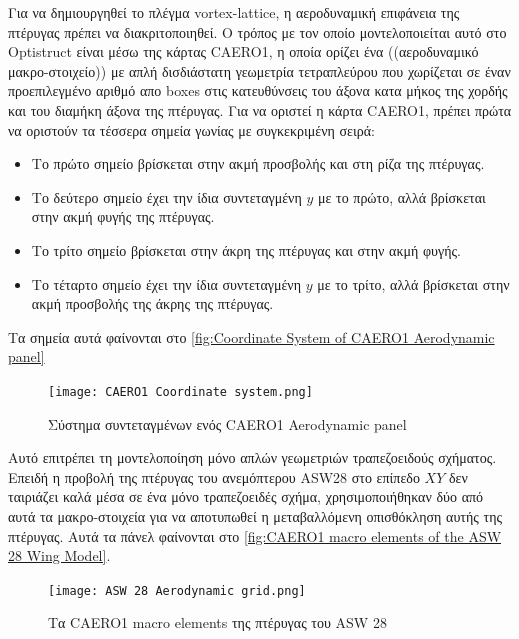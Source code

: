 Για να δημιουργηθεί το πλέγμα \textlatin{vortex-lattice}, η αεροδυναμική επιφάνεια της πτέρυγας πρέπει να διακριτοποιηθεί. Ο τρόπος με τον οποίο μοντελοποιείται αυτό στο \textlatin{Optistruct} είναι μέσω της κάρτας \textlatin{CAERO1}, η οποία ορίζει ένα ((αεροδυναμικό μακρο-στοιχείο)) με απλή δισδιάστατη γεωμετρία τετραπλεύρου που χωρίζεται σε έναν προεπιλεγμένο αριθμό απο \textlatin{boxes} στις κατευθύνσεις του άξονα κατα μήκος της χορδής και του διαμήκη άξονα της πτέρυγας. Για να οριστεί η κάρτα \textlatin{CAERO1}, πρέπει πρώτα να οριστούν τα τέσσερα σημεία γωνίας με συγκεκριμένη σειρά:


\begin{itemize}
  \item
    Το πρώτο σημείο βρίσκεται στην ακμή προσβολής και στη ρίζα της πτέρυγας.
  \item
    Το δεύτερο σημείο έχει την ίδια συντεταγμένη \(y\) με το πρώτο, αλλά βρίσκεται στην ακμή φυγής της πτέρυγας.
  \item
    Το τρίτο σημείο βρίσκεται στην άκρη της πτέρυγας και στην ακμή φυγής.
  \item
    Το τέταρτο σημείο έχει την ίδια συντεταγμένη \(y\) με το τρίτο, αλλά βρίσκεται στην ακμή προσβολής της άκρης της πτέρυγας.
\end{itemize}

Τα σημεία αυτά φαίνονται στο \autoref{fig:Coordinate System of CAERO1 Aerodynamic panel} 
  

\begin{figure}[H]
    \centering
    \texttt{[image: CAERO1 Coordinate system.png]}
    \caption{Σύστημα συντεταγμένων ενός \textlatin{CAERO1 Aerodynamic panel \cite{altair_flutter_tips}}}
    \label{fig:Coordinate System of CAERO1 Aerodynamic panel}

\end{figure}


Αυτό επιτρέπει τη μοντελοποίηση μόνο απλών γεωμετριών τραπεζοειδούς σχήματος. Επειδή η προβολή της πτέρυγας του ανεμόπτερου \textlatin{ASW28} στο επίπεδο $XY$ δεν ταιριάζει καλά μέσα σε ένα μόνο τραπεζοειδές σχήμα, χρησιμοποιήθηκαν δύο από αυτά τα μακρο-στοιχεία για να αποτυπωθεί η μεταβαλλόμενη οπισθόκληση αυτής της πτέρυγας. Αυτά τα πάνελ φαίνονται στο \autoref{fig:CAERO1 macro elements of the ASW 28 Wing Model}.


\begin{figure}[H]
\centering
\texttt{[image: ASW 28 Aerodynamic grid.png]}
\caption{ Τα \textlatin{CAERO1 macro elements} της πτέρυγας του \textlatin{ASW 28}}
\label{fig:CAERO1 macro elements of the ASW 28 Wing Model}

\end{figure}


